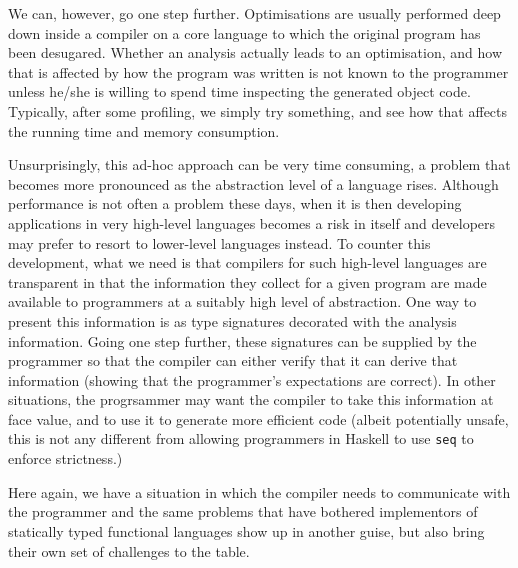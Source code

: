 \documentclass[sigplan,10pt,noacm]{acmart}
\begin{document}
We can, however, go one step further. Optimisations are usually performed
deep down inside a compiler on a core language to which
the original program has been desugared. Whether an analysis actually
leads to an optimisation, and how that is affected by how the program
was written is not known to the programmer unless he/she is willing
to spend time inspecting the generated object code. Typically, 
after some profiling, we simply try something, and see how that affects 
the running time and memory consumption.

Unsurprisingly, this ad-hoc approach can be very time consuming, a problem
that becomes more pronounced as the abstraction level of a language rises.
Although performance is not often a problem these days, when it is then developing
applications in very high-level languages becomes a risk in itself 
and developers may prefer to resort to lower-level languages instead. 
To counter this development,
what we need is that compilers for such high-level languages are transparent in that the 
information they collect for a given program are made available to programmers 
at a suitably high level of abstraction. One way to present this information
is as type signatures decorated with the analysis information. Going one step
further, these signatures can be supplied by the programmer so that
the compiler can either verify that it can derive that information (showing
that the programmer's expectations are correct). In other situations,
the progrsammer may want the compiler to take this information at
face value, and to use it to generate more efficient code 
(albeit potentially unsafe, this
is not any different from allowing programmers in Haskell to use
\texttt{seq} to enforce strictness.)

Here again, we have a situation in which the compiler needs to communicate
with the programmer and the same problems that have bothered implementors 
of statically typed functional languages show up in another guise,
but also bring their own set of challenges to the table.


\end{document}
